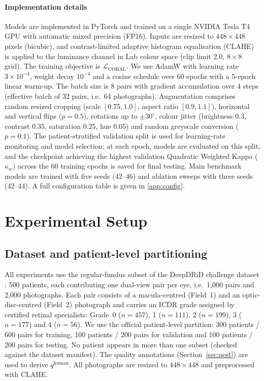 \documentclass[final,5p,times,twocolumn,authoryear]{elsarticle}
\theoremstyle{plain}
\theoremstyle{remark}
\begin{document}
\paragraph{Implementation details} Models are implemented in PyTorch and trained on a single NVIDIA Tesla T4 GPU with automatic mixed precision (FP16). Inputs are resized to $448 \times 448$ pixels (bicubic), and contrast-limited adaptive histogram equalisation (CLAHE) is applied to the luminance channel in Lab colour space (clip limit 2.0, $8 \times 8$ grid). The training objective is $\mathcal{L}_{\text{CORAL}}$. We use AdamW with learning rate $3 \times 10^{-4}$, weight decay $10^{-4}$ and a cosine schedule over 60 epochs with a 5-epoch linear warm-up. The batch size is 8 pairs with gradient accumulation over 4 steps (effective batch of 32 pairs, i.e.\ 64 photographs). Augmentation comprises random resized cropping (scale $[0.75, 1.0]$, aspect ratio $[0.9, 1.1]$), horizontal and vertical flips ($p=0.5$), rotations up to $\pm 30^\circ$, colour jitter (brightness 0.3, contrast 0.35, saturation 0.25, hue 0.05) and random greyscale conversion ($p=0.1$). The patient-stratified validation split is used for learning-rate monitoring and model selection; at each epoch, models are evaluated on this split, and the checkpoint achieving the highest validation Quadratic Weighted Kappa ($\kappa_w$) across the 60 training epochs is saved for final testing. Main benchmark models are trained with five seeds (42--46) and ablation sweeps with three seeds (42--44). A full configuration table is given in \ref{app:config}.

\section{Experimental Setup}
\label{sec:experiments}

\subsection{Dataset and patient-level partitioning}
\label{sec:dataset}

All experiments use the regular-fundus subset of the DeepDRiD challenge dataset \citep{Liu2022deepdrid}: 500 patients, each contributing one dual-view pair per eye, i.e.\ 1{,}000 pairs and 2{,}000 photographs. Each pair consists of a macula-centred (Field~1) and an optic-disc-centred (Field~2) photograph and carries an ICDR grade assigned by certified retinal specialists: Grade~0 ($n=457$), 1 ($n=111$), 2 ($n=199$), 3 ($n=177$) and 4 ($n=56$). We use the official patient-level partition: 300 patients / 600 pairs for training, 100 patients / 200 pairs for validation and 100 patients / 200 pairs for testing. No patient appears in more than one subset (checked against the dataset manifest). The quality annotations (Section~\ref{sec:qest}) are used to derive $q^{\text{human}}$. All photographs are resized to $448\times448$ and preprocessed with CLAHE.
\end{document}
